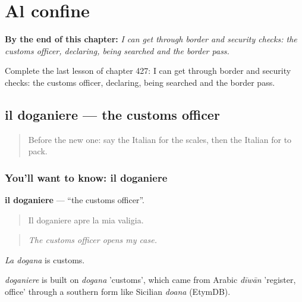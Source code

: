 
\chapter{Al confine}
\label{ch:it-al-confine}

\begin{chapteropening}
\textbf{By the end of this chapter:} \emph{I can get through border and security checks: the customs officer, declaring, being searched and the border pass.}

Complete the last lesson of chapter 427: I can get through border and security checks: the customs officer, declaring, being searched and the border pass.
\end{chapteropening}

\section[il doganiere]{il doganiere — the customs officer}

\label{lesson:IT-C427-doganiere}



\begin{quote}
Before the new one: say the Italian for the scales, then the Italian for to pack.
\end{quote}

\subsection*{You'll want to know: il doganiere}
\textbf{il doganiere} — \textquotedblleft{}the customs officer\textquotedblright{}.

\begin{quote}
Il doganiere apre la mia valigia.
\end{quote}

\begin{quote}
\emph{The customs officer opens my case.}
\end{quote}

\emph{La dogana} is customs.

\begin{cousinweb}
\emph{doganiere} is built on \emph{dogana} 'customs', which came from Arabic \emph{dīwān} 'register, office' through a southern form like Sicilian \emph{doana} (EtymDB).
\end{cousinweb}

